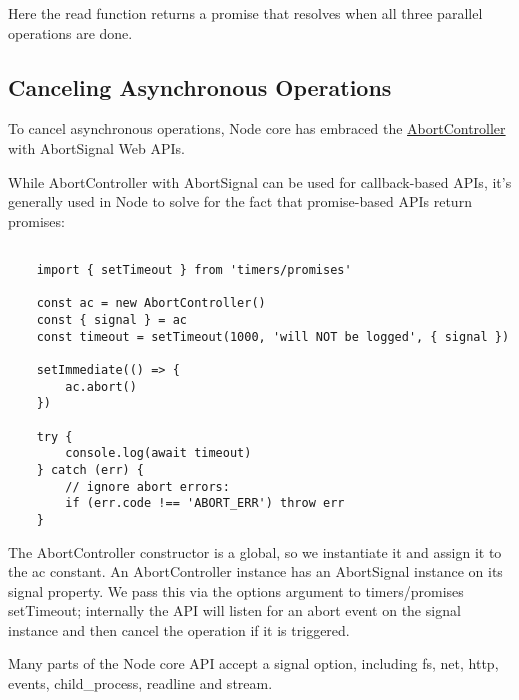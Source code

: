 \documentclass{scrartcl}
\begin{document}
Here the read function returns a promise that resolves when all three parallel operations are done.

\subsection{Canceling Asynchronous Operations}

To cancel asynchronous operations, Node core has embraced the  \href{https://developer.mozilla.org/en-US/docs/Web/API/AbortController}{AbortController} with AbortSignal Web APIs.

While AbortController with AbortSignal can be used for callback-based APIs, it's generally used in Node to solve for the fact that promise-based APIs return promises:


\begin{lstlisting}[style=ES6]

    import { setTimeout } from 'timers/promises'

    const ac = new AbortController()
    const { signal } = ac
    const timeout = setTimeout(1000, 'will NOT be logged', { signal })

    setImmediate(() => {
        ac.abort()
    })

    try {
        console.log(await timeout)
    } catch (err) {
        // ignore abort errors:
        if (err.code !== 'ABORT_ERR') throw err
    }

\end{lstlisting}

The AbortController constructor is a global, so we instantiate it and assign it to the ac constant. An AbortController instance has an AbortSignal instance on its signal property. We pass this via the options argument to timers/promises setTimeout; internally the API will listen for an abort event on the signal instance and then cancel the operation if it is triggered.

Many parts of the Node core API accept a signal option, including fs, net, http, events, child\_process, readline and stream.

\begin{lstlisting}[style=ES6]

\end{lstlisting}

\begin{lstlisting}[style=ES6]

\end{lstlisting}

\begin{lstlisting}[style=ES6]

\end{lstlisting}
\end{document}
